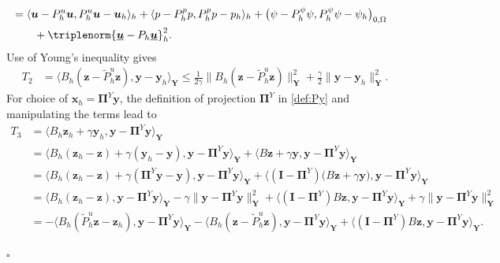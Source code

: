 \documentclass[smallextended]{svjour3}
\renewenvironment{proof}{\noindent{\it Proof.}}{\hfill$\square$}
\numberwithin{equation}{section}
\numberwithin{figure}{section}
\numberwithin{table}{section}
\newcommand\bI{\mathbf{I}}
\newcommand\bPi{\boldsymbol{\Pi}}
\newcommand{\tP}{\tilde{P}}
\newcommand\buu{\underline{\boldsymbol{u}}}
\newcommand\bx{\boldsymbol{x}}
\newcommand\by{\boldsymbol{y}}
\newcommand\bu{\boldsymbol{u}}
\newcommand\bz{\boldsymbol{z}}
\newcommand{\bY}{\boldsymbol{Y}}
\begin{document}
\begin{proof}
\begin{align*}
        \\
		& = \langle \bu - P_h^u \bu, P_h^u \bu - \bu_h \rangle_h 
        + \langle p - P_h^p p, P_h^p p - p_h \rangle_h + \big( \psi- P_h^\psi \psi, P_h^\psi \psi - \psi_h  \big)_{0, \Omega}
        \\
		& \qquad  
        + \triplenorm{ \buu - P_h \buu}_h^2.
	\end{align*}
Use of Young's inequality gives
\begin{align*} 
T_2 &= \langle B_h( \bz - \tP_h^u \bz), \by - \by_h \rangle_{\bY} \le \frac{1}{2 \gamma}\|  B_h( \bz - \tP_h^u \bz)\|_{\bY}^2 + \frac{\gamma}{2} \| \by - \by_h \|_{\bY}^2.
\end{align*}
For choice of $\bx_h =\bPi^Y \by$, the definition of projection $\bPi^Y$ in \eqref{def:Py} and manipulating the terms lead to
	\begin{align*} 
        T_3 &= \langle B_h \bz_h + \gamma \by_h, \by - \bPi^Y \by \rangle_{\bY} \\
		& = \langle B_h (\bz_h- \bz) + \gamma (\by_h - \by), \by - \bPi^Y \by \rangle_{\bY} + \langle B \bz + \gamma \by, \by - \bPi^Y \by \rangle_{\bY} \\
		& = \langle B_h (\bz_h- \bz) + \gamma (\bPi^Y \by - \by), \by - \bPi^Y \by \rangle_{\bY} + \langle (\bI - \bPi^Y) \big(B \bz + \gamma \by\big), \by - \bPi^Y \by \rangle_{\bY} \\
		& = \langle B_h (\bz_h- \bz), \by - \bPi^Y \by \rangle_{\bY} - \gamma \|\by - \bPi^Y \by \|_{\bY}^2 + \langle (\bI - \bPi^Y) B \bz, \by - \bPi^Y \by \rangle_{\bY} + \gamma \|\by - \bPi^Y \by \|_{\bY}^2\\
		& = - \langle B_h (\tP_h^u \bz - \bz_h), \by - \bPi^Y \by \rangle_{\bY} - \langle B_h (\bz- \tP_h^u \bz), \by - \bPi^Y \by \rangle_{\bY} + \langle (\bI - \bPi^Y) B \bz, \by - \bPi^Y \by \rangle_{\bY}.
	\end{align*}


\end{proof}
\end{document}
